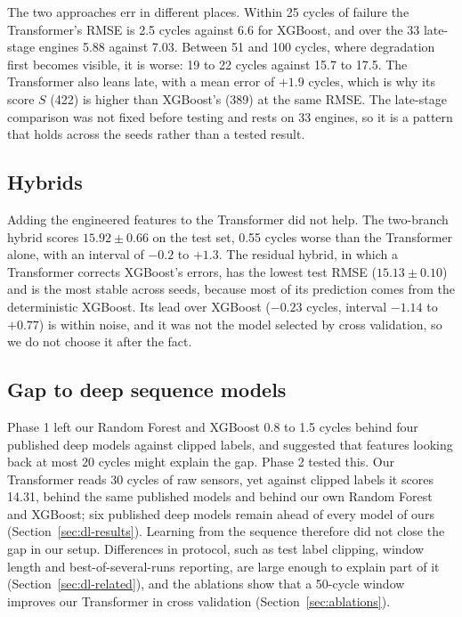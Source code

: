 The two approaches err in different places. Within 25 cycles of failure
the Transformer's RMSE is 2.5 cycles against 6.6 for XGBoost, and over the
33 late-stage engines 5.88 against 7.03. Between 51 and 100 cycles, where
degradation first becomes visible, it is worse: 19 to 22 cycles against
15.7 to 17.5. The Transformer also leans late, with a mean error of $+1.9$
cycles, which is why its score $S$ (422) is higher than XGBoost's (389) at
the same RMSE. The late-stage comparison was not fixed before testing and
rests on 33 engines, so it is a pattern that holds across the seeds rather
than a tested result.

\subsection{Hybrids}
Adding the engineered features to the Transformer did not help. The
two-branch hybrid scores $15.92 \pm 0.66$ on the test set, 0.55 cycles
worse than the Transformer alone, with an interval of $-0.2$ to $+1.3$. The
residual hybrid, in which a Transformer corrects XGBoost's errors, has the
lowest test RMSE ($15.13 \pm 0.10$) and is the most stable across seeds,
because most of its prediction comes from the deterministic XGBoost. Its
lead over XGBoost ($-0.23$ cycles, interval $-1.14$ to $+0.77$) is within
noise, and it was not the model selected by cross validation, so we do not
choose it after the fact.

\subsection{Gap to deep sequence models}
Phase 1 left our Random Forest and XGBoost 0.8 to 1.5 cycles behind four
published deep models against clipped labels, and suggested that features
looking back at most 20 cycles might explain the gap. Phase 2 tested this.
Our Transformer reads 30 cycles of raw sensors, yet against clipped labels
it scores 14.31, behind the same published models and behind our own
Random Forest and XGBoost; six published deep models remain ahead of every
model of ours (Section~\ref{sec:dl-results}). Learning from the sequence
therefore did not close the gap in our setup. Differences in protocol,
such as test label clipping, window length and best-of-several-runs
reporting, are large enough to explain part of it
(Section~\ref{sec:dl-related}), and the ablations show that a 50-cycle
window improves our Transformer in cross validation
(Section~\ref{sec:ablations}).

